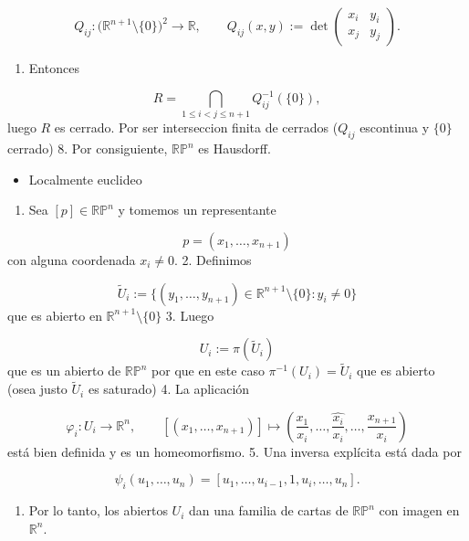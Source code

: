 \begin{bookproof}{}
\[
Q_{ij}:\bigl(\mathbb{R}^{n+1}\setminus\{0\}\bigr)^2\longrightarrow \mathbb{R},\qquad Q_{ij}(x,y):= \det\begin{pmatrix}x_i & y_i\\ x_j & y_j\end{pmatrix}.
\]
\begin{enumerate}[start=7]
\item Entonces
\end{enumerate}
\[
R=\bigcap_{1\le i<j\le n+1} Q_{ij}^{-1}(\{0\}),
\]
luego $R$ es cerrado. Por ser interseccion finita de cerrados ($Q_{ij}$ escontinua y $\{ 0 \}$ cerrado) 8. Por consiguiente, $\mathbb{RP}^n$ es Hausdorff.

\begin{itemize}
\item Localmente euclideo
\end{itemize}
\begin{enumerate}
\item Sea $[p]\in \mathbb{RP}^n$ y tomemos un representante
\end{enumerate}
\[
p=(x_1,\dots,x_{n+1})
\]
con alguna coordenada $x_i\neq 0$. 2. Definimos

\[
\widetilde U_i:=\{(y_1,\dots,y_{n+1})\in \mathbb{R}^{n+1}\setminus\{0\}:y_i\neq 0\}
\]
que es abierto en $\mathbb{R}^{n+1}\setminus\{0\}$ 3. Luego

\[
U_i:=\pi(\widetilde U_i)
\]
que es un abierto de $\mathbb{RP}^n$ por que en este caso $\pi ^{-1}(U_{i})=\tilde{U}_{i}$ que es abierto (osea justo $\tilde{U}_{i}$ es saturado) 4. La aplicación

\[
\varphi_i:U_i\longrightarrow \mathbb{R}^n, \qquad [(x_1,\dots,x_{n+1})] \longmapsto \left( \frac{x_1}{x_i},\dots,\widehat{\frac{x_i}{x_i}},\dots,\frac{x_{n+1}}{x_i} \right)
\]
está bien definida y es un homeomorfismo. 5. Una inversa explícita está dada por

\[
\psi_i(u_1,\dots,u_n) = [u_1,\dots,u_{i-1},1,u_i,\dots,u_n].
\]
\begin{enumerate}[start=6]
\item Por lo tanto, los abiertos $U_i$ dan una familia de cartas de $\mathbb{RP}^n$ con imagen en $\mathbb{R}^n$.
\end{enumerate}
\bookqed
\end{bookproof}
